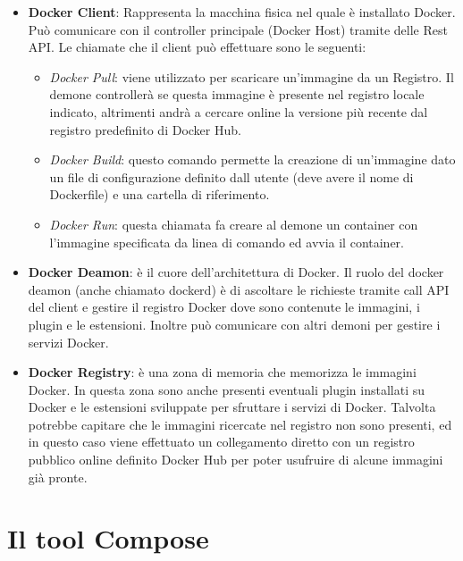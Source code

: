 \begin{itemize}
    \item \textbf{Docker Client}: Rappresenta la macchina fisica nel quale è installato Docker. Può comunicare con il controller principale (Docker Host) tramite delle Rest API.
    Le chiamate che il client può effettuare sono le seguenti:
        \begin{itemize}
            \item \textit{Docker Pull}: viene utilizzato per scaricare un'immagine da un Registro. Il demone controllerà se questa immagine è presente nel registro locale indicato, altrimenti andrà a cercare online
                la versione più recente dal registro predefinito di Docker Hub.
            \item \textit{Docker Build}: questo comando permette la creazione di un'immagine dato un file di configurazione definito dall utente (deve avere il nome di Dockerfile) e una cartella di riferimento.
            \item \textit{Docker Run}: questa chiamata fa creare al demone un container con l'immagine specificata da linea di comando ed avvia il container.
        \end{itemize}
    \item \textbf{Docker Deamon}: è il cuore dell'architettura di Docker. Il ruolo del docker deamon (anche chiamato dockerd) è di ascoltare le richieste tramite call API del client e gestire il registro Docker dove sono contenute
        le immagini, i plugin e le estensioni. Inoltre può comunicare con altri demoni per gestire i servizi Docker.
    \item \textbf{Docker Registry}: è  una zona di memoria che memorizza le immagini Docker. In questa zona sono anche presenti eventuali plugin installati su Docker e le estensioni sviluppate per sfruttare i servizi di Docker.
        Talvolta potrebbe capitare che le immagini ricercate nel registro non sono presenti, ed in questo caso viene effettuato un collegamento diretto con un registro pubblico online definito Docker Hub per poter usufruire di alcune
        immagini già pronte.
\end{itemize}


\section{Il tool Compose}

